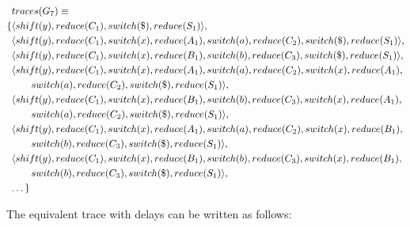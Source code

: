 \documentclass[11pt]{article}
\begin{document}
\parbox{.3\textwidth}{\begin{align*}
&traces(G_7) \equiv \\
\{ & \langle shift(y), reduce(C_1), switch(\$), reduce(S_1) \rangle,\\
   & \langle shift(y), reduce(C_1), switch(x), reduce(A_1), switch(a), reduce(C_2), switch(\$), reduce(S_1) \rangle,\\
   & \langle shift(y), reduce(C_1), switch(x), reduce(B_1), switch(b), reduce(C_3), switch(\$), reduce(S_1) \rangle,\\
   & \langle shift(y), reduce(C_1), switch(x), reduce(A_1), switch(a), reduce(C_2), switch(x), reduce(A_1), \\&\qquad switch(a), reduce(C_2), switch(\$), reduce(S_1) \rangle,\\
   & \langle shift(y), reduce(C_1), switch(x), reduce(B_1), switch(b), reduce(C_3), switch(x), reduce(A_1), \\&\qquad switch(a), reduce(C_2), switch(\$), reduce(S_1) \rangle,\\
   & \langle shift(y), reduce(C_1), switch(x), reduce(A_1), switch(a), reduce(C_2), switch(x), reduce(B_1), \\&\qquad switch(b), reduce(C_3), switch(\$), reduce(S_1) \rangle,\\
   & \langle shift(y), reduce(C_1), switch(x), reduce(B_1), switch(b), reduce(C_3), switch(x), reduce(B_1), \\&\qquad switch(b), reduce(C_3), switch(\$), reduce(S_1) \rangle,\\
   & \textellipsis \}
\end{align*}}

The equivalent trace with delays can be written as follows:
\end{document}
